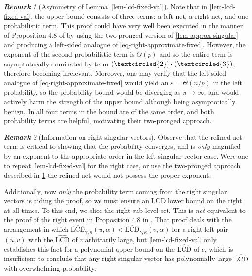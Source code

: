 \documentclass[11pt]{article}
\numberwithin{equation}{section}
\theoremstyle{remark}
\newtheorem{remark}{\bf Remark}[section]
\newcommand{\LCD}{\mathrm{LCD}}
\newcommand{\rLCD}{\widehat{\mathrm{LCD}}}
\begin{document}
\begin{remark}[Asymmetry of Lemma~\ref{lem-lcd-fixed-val}]\label{remark-one-sided}
    Note that in \cref{lem-lcd-fixed-val}, the upper bound consists of three terms: a left net, a right net, and one probabilistic term. This proof could have very well been executed in the manner of Proposition 4.8 of \cite{christoffersen2025gaps} by using the two-pronged version of \cref{lem-approx-singular} and producing a left-sided analogue of \cref{eq-right-approximate-fixed}. However, the exponent of the second probabilistic term is $\Theta(p)$ and so the entire term is asymptotocally dominated by term $(\textcircled{2}) \cdot (\textcircled{3})$, therefore becoming irrelevant. Moreover, one may verify that the left-sided analogue of \cref{eq-right-approximate-fixed} would yield an $\varepsilon = \Theta(n/p)$ in the left probability, so the probability bound would be diverging as $n \to \infty$, and would actively harm the strength of the upper bound although being asymptotically benign. In \cite{christoffersen2025gaps} all four terms in the bound are of the same order, and both probability terms are helpful, motivating their two-pronged approach.
\end{remark}

\begin{remark}[Information on right singular vectors]\label{remark-right-sing-vecs}
    Observe that the refined net term is critical to showing that the probability converges, and is \textit{only} magnified by an exponent to the appropriate order in the left singular vector case. Were one to repeat \cref{lem-lcd-fixed-val} for the right case, or use the two-pronged approach described in \cref{remark-one-sided} the refined net would not possess the proper exponent. 
    
    Additionally, now \textit{only} the probability term coming from the right singular vectors is aiding the proof, so we must ensure an $\LCD$ lower bound on the right at all times. To this end, we slice the right sub-level set. This is \textit{not} equivalent to the proof of the right event in Proposition 4.8 in \cite{christoffersen2025gaps}. That proof deals with the arrangement in which $\rLCD_{\gamma, \kappa}(u, \alpha) < \rLCD_{\gamma, \kappa}(v, \alpha)$ for a right-left pair $(u, v)$ with the $\rLCD$ of $v$ arbitrarily large, but \cref{lem-lcd-fixed-val} only establishes this fact for a polynomial upper bound on the $\rLCD$ of $v$, which is insufficient to conclude that any right singular vector has polynomially large $\rLCD$ with overwhelming probability.
\end{remark}
\end{document}
